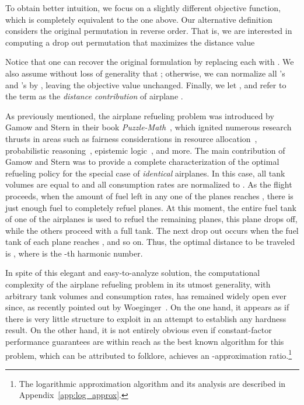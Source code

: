 \documentclass[11pt]{article}
\theoremstyle{plain}
\theoremstyle{definition}
\begin{document}
To obtain better intuition, we focus on a slightly different objective function, which is completely equivalent to the one above. Our alternative definition considers the original permutation in reverse order. That is, we are interested in computing a drop out permutation  that maximizes the distance value

Notice that one can recover the original formulation by replacing each  with . We also assume without loss of generality that ; otherwise, we can normalize all 's and 's by , leaving the objective value unchanged. Finally, we let , and refer to the term  as the \textit{distance contribution} of airplane .

\smallskip {} As previously mentioned, the airplane refueling problem was introduced by Gamow and Stern in their book \textit{Puzzle-Math}~\cite{GamowS58}, which ignited numerous research thrusts in areas such as fairness considerations in resource allocation~\cite{Thomson11, Procaccia13}, probabilistic reasoning~\cite{Knuth69, Wuffle82, DeS96}, epistemic logic~\cite{BaltagDM08, DitmarschRV08}, and more. The main contribution of Gamow and Stern was to  provide a complete characterization of the optimal refueling policy for the special case of \textit{identical} airplanes. In this case, all tank volumes are equal to  and all consumption rates are normalized to . As the flight proceeds, when the amount of fuel left in any one of the  planes reaches , there is just enough fuel to completely refuel  planes. At this moment, the entire fuel tank of one of the airplanes is used to refuel the remaining planes, this plane drops off, while the others proceed with a full tank. The next drop out occurs when the fuel tank of each plane reaches , and so on. Thus, the optimal distance to be traveled is , where  is the -th harmonic number.

In spite of this elegant and easy-to-analyze solution, the computational complexity of the airplane refueling problem in its utmost generality, with arbitrary tank volumes and consumption rates, has remained widely open ever since, as recently pointed out by Woeginger~\cite{Dagstuhl2010}. On the one hand, it appears as if there is very little structure to exploit in an attempt to establish any hardness result. On the other hand, it is not entirely obvious even if constant-factor performance guarantees are within reach as the best known algorithm for this problem, which can be attributed to folklore, achieves an -approximation ratio.\footnote{The logarithmic approximation algorithm and its analysis are described in Appendix~\ref{app:log_approx}.}
\end{document}

